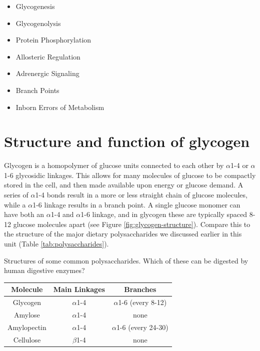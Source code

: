 \documentclass{tufte-handout}
\begin{document}
\begin{itemize}
	\item Glycogenesis
	\item Glycogenolysis
	\item Protein Phosphorylation
	\item Allosteric Regulation
	\item Adrenergic Signaling
	\item Branch Points
	\item Inborn Errors of Metabolism
\end{itemize}

\section{Structure and function of glycogen}

Glycogen is a homopolymer of glucose units connected to each other by $\alpha$1-4 or $\alpha$1-6 glycosidic linkages.  This allows for many molecules of glucose to be compactly stored in the cell, and then made available upon energy or glucose demand.  A series of $\alpha$1-4 bonds result in a more or less straight chain of glucose molecules, while a $\alpha$1-6 linkage results in a branch point.  A single glucose monomer can have both an $\alpha$1-4 and $\alpha$1-6 linkage, and in glycogen these are typically spaced 8-12 glucose molecules apart (see Figure \ref{fig:glycogen-structure}).  Compare this to the structure of the major dietary polysaccharides we discussed earlier in this unit (Table \ref{tab:polysaccharides}).

\begin{margintable}
\centering
\caption{Structures of some common polysaccharides.  Which of these can be digested by human digestive enzymes?}
\label{tab:polysaccharides}
\begin{tabular}{ccc}
\hline
\textbf {Molecule} & \textbf{Main Linkages} & \textbf{Branches}   \\
\hline
Glycogen & $\alpha$1-4 & $\alpha$1-6 (every 8-12) \\
Amylose & $\alpha$1-4 & none \\
Amylopectin & $\alpha$1-4 & $\alpha$1-6 (every 24-30) \\
Cellulose & $\beta$1-4 & none \\
\hline
\end{tabular}
\end{margintable}
\end{document}
